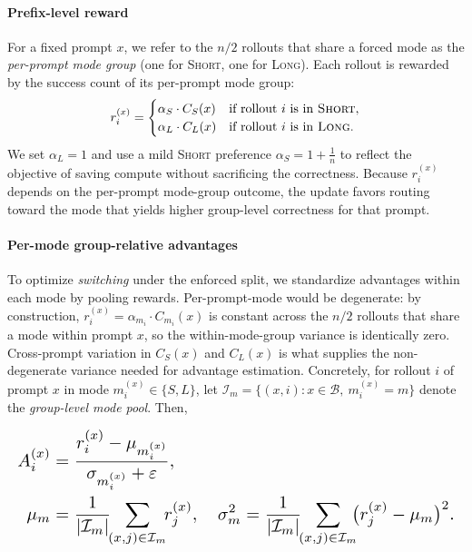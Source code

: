 \paragraph{Prefix-level reward}
For a fixed prompt $x$, we refer to the $n/2$ rollouts that share a forced mode as the \emph{per-prompt mode group} (one for \textsc{Short}, one for \textsc{Long}). Each rollout is rewarded by the success count of its per-prompt mode group:
\vspace{-10pt}
\[
r_i^{(x)}=
\begin{cases}
\alpha_S \cdot C_S(x) & \text{if rollout } i \text{ is in \textsc{Short}},\\
\alpha_L \cdot C_L(x) & \text{if rollout } i \text{ is in \textsc{Long}}.
\end{cases}
\]
We set $\alpha_L{=}1$ and use a mild \textsc{Short} preference $\alpha_S{=}1+\frac{1}{n}$ to reflect the objective of saving compute without sacrificing the correctness.
Because $r_i^{(x)}$ depends on the per-prompt mode-group outcome, the update favors routing toward the mode that yields higher group-level correctness for that prompt.

\paragraph{Per-mode group-relative advantages}
To optimize \emph{switching} under the enforced split, we standardize advantages within each mode by pooling rewards. Per-prompt-mode would be degenerate: by construction, $r_i^{(x)}=\alpha_{m_i}\!\cdot\! C_{m_i}(x)$ is constant across the $n/2$ rollouts that share a mode within prompt $x$, so the within-mode-group variance is identically zero. Cross-prompt variation in $C_S(x)$ and $C_L(x)$ is what supplies the non-degenerate variance needed for advantage estimation. Concretely, for rollout $i$ of prompt $x$ in mode $m_i^{(x)} \in \{S, L\}$, let $\mathcal{I}_m = \{(x,i) : x \in \mathcal{B},\ m_i^{(x)} = m\}$ denote the \emph{group-level mode pool}. Then,

\[
\resizebox{\linewidth}{!}{$
\begin{aligned}
A_i^{(x)} &= \frac{r_i^{(x)} - \mu_{m_i^{(x)}}}{\sigma_{m_i^{(x)}} + \varepsilon}, \\
\mu_m &= \frac{1}{|\mathcal{I}_m|}\!\!\sum_{(x,j) \in \mathcal{I}_m}\!\! r_j^{(x)},\quad
\sigma_m^2 = \frac{1}{|\mathcal{I}_m|}\!\!\sum_{(x,j) \in \mathcal{I}_m}\!\!\bigl(r_j^{(x)}-\mu_m\bigr)^2.
\end{aligned}
$}
\]


